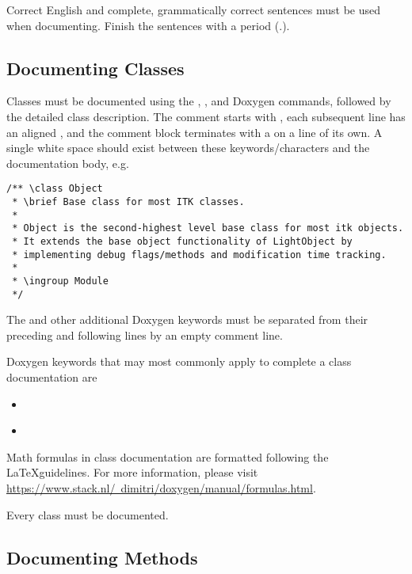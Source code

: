 Correct English and complete, grammatically correct sentences must be used
when documenting. Finish the sentences with a period (.).


\subsection{Documenting Classes}
\label{subsec:DocumentingClasses}

Classes must be documented using the ,
, and
 Doxygen commands, followed by the detailed class description.
The comment starts with \code{/**}, each subsequent line has an aligned
\code{*}, and the comment block terminates with a \code{*/} on a line of its
own. A single white space should exist between these keywords/characters and
the documentation body, e.g.

\small
\begin{verbatim}
/** \class Object
 * \brief Base class for most ITK classes.
 *
 * Object is the second-highest level base class for most itk objects.
 * It extends the base object functionality of LightObject by
 * implementing debug flags/methods and modification time tracking.
 *
 * \ingroup Module
 */
\end{verbatim}
\normalsize

The  and other additional Doxygen keywords must be separated from
their preceding and following lines by an empty comment \code{*} line.

Doxygen keywords that may most commonly apply to complete a class documentation are
\begin{itemize}
  \item \textbf{}
  \item \textbf{}
\end{itemize}

Math formulas in class documentation are formatted following the \LaTeX guidelines.
For more information, please visit
\href{https://www.stack.nl/~dimitri/doxygen/manual/formulas.html}
{https://www.stack.nl/~dimitri/doxygen/manual/formulas.html}.

Every class must be documented.


\subsection{Documenting Methods}
\label{subsec:DocumentingMethods}

